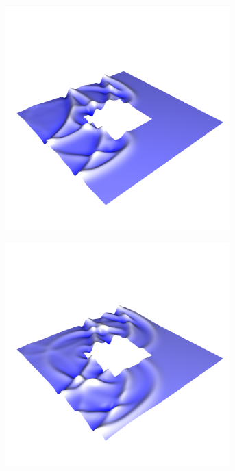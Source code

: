 \documentclass[crop=false,10pt,ngerman]{standalone}
\begin{document}
\begin{figure}[p]
        \begin{subfigure}[b]{0.24\textwidth}
          \center
          \includegraphics[trim={0.9cm 1.8cm 0.5cm 5cm},clip,width=0.95\textwidth]{images/ring_wave_4.png}
          \caption{}
        \end{subfigure}
        \begin{subfigure}[b]{0.24\textwidth}
          \center
          \includegraphics[trim={0.9cm 1.8cm 0.5cm 5cm},clip,width=0.95\textwidth]{images/ring_wave_5.png}

\end{subfigure}
\end{figure}
\end{document}
